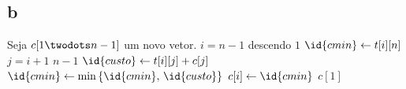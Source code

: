\subsection{b}

\begin{codebox}
    \li Seja $c[1 \twodots n - 1]$ um novo vetor.
    \li
    \li {} $i = n - 1$ descendo  $1$
        \Do
    \li     $\id{cmin} \gets t[i][n]$
    \li     {} $j = i + 1$  $n - 1$
            \Do
    \li         $\id{custo} \gets t[i][j] + c[j]$
    \li         $\id{cmin} \gets \min\left\{\id{cmin},\, \id{custo}\right\}$
            \End
    \li     $c[i] \gets \id{cmin}$
        \End
    \li
    \li {} $c[1]$
\end{codebox}
